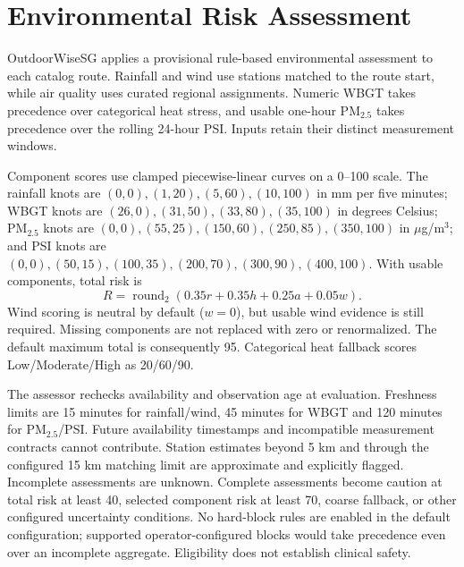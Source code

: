 \section{Environmental Risk Assessment}
OutdoorWiseSG applies a provisional rule-based environmental assessment to each
catalog route. Rainfall and wind use stations matched to the route start, while
air quality uses curated regional assignments. Numeric WBGT takes precedence over
categorical heat stress, and usable one-hour PM$_{2.5}$ takes precedence over the
rolling 24-hour PSI. Inputs retain their distinct measurement windows.

Component scores use clamped piecewise-linear curves on a 0--100 scale. The
rainfall knots are $(0,0),(1,20),(5,60),(10,100)$ in mm per five minutes;
WBGT knots are $(26,0),(31,50),(33,80),(35,100)$ in degrees Celsius;
PM$_{2.5}$ knots are $(0,0),(55,25),(150,60),(250,85),(350,100)$ in
$\mu$g/m$^3$; and PSI knots are $(0,0),(50,15),(100,35),(200,70),
(300,90),(400,100)$. With usable components, total risk is
\begin{equation}
R=\operatorname{round}_{2}(0.35r+0.35h+0.25a+0.05w).
\end{equation}
Wind scoring is neutral by default ($w=0$), but usable wind evidence is still
required. Missing components are not replaced with zero or renormalized. The
default maximum total is consequently 95. Categorical heat fallback scores
Low/Moderate/High as 20/60/90.

The assessor rechecks availability and observation age at evaluation. Freshness
limits are 15 minutes for rainfall/wind, 45 minutes for WBGT and 120 minutes for
PM$_{2.5}$/PSI. Future availability timestamps and incompatible measurement
contracts cannot contribute. Station estimates beyond 5 km and through the
configured 15 km matching limit are approximate and explicitly flagged.
Incomplete assessments are unknown. Complete assessments become caution at total
risk at least 40, selected component risk at least 70, coarse fallback, or other
configured uncertainty conditions. No hard-block rules are enabled in the default
configuration; supported operator-configured blocks would take precedence even
over an incomplete aggregate. Eligibility does not establish clinical safety.

